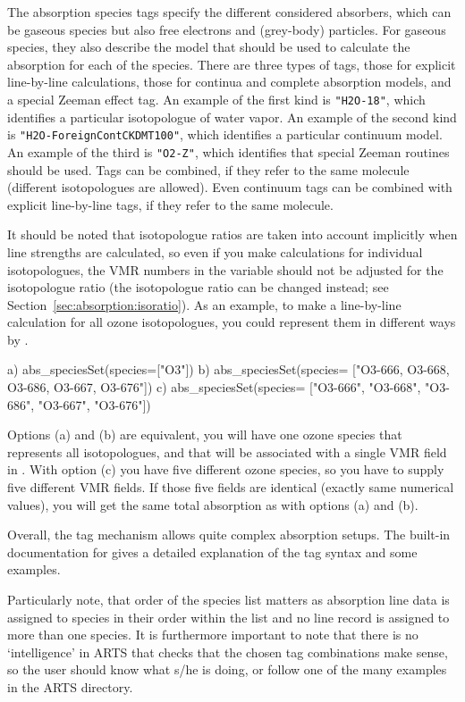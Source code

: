 The absorption species tags specify the different considered absorbers, which can
be gaseous species but also free electrons and (grey-body) particles.
For gaseous species, they also describe the model that should be used to
calculate the absorption for each of the species.
There are three types of tags, those for explicit line-by-line
calculations, those for continua and complete absorption models, and a special
Zeeman effect tag.
An example of the first kind is \verb|"H2O-18"|, which identifies a
particular isotopologue of water vapor. An example of the second kind is
\verb|"H2O-ForeignContCKDMT100"|, which identifies a particular continuum
model. An example of the third is \verb|"O2-Z"|, which identifies that special Zeeman
routines should be used.
Tags can be combined, if they refer to the same molecule
(different isotopologues are allowed). Even continuum tags can be combined
with explicit line-by-line tags, if they refer to the same molecule.

It should be noted that isotopologue ratios are taken into account
implicitly when line strengths are calculated, so even if you make
calculations for individual isotopologues, the VMR numbers in the
variable  should not be adjusted for the isotopologue
ratio (the isotopologue ratio can be changed instead; see
Section~\ref{sec:absorption:isoratio}). As an example, to make a line-by-line
calculation for all ozone isotopologues, you could represent them in different
ways by
.
\begin{code}
a) abs_speciesSet(species=["O3"])
b) abs_speciesSet(species=
                  ["O3-666, O3-668, O3-686, O3-667, O3-676"])
c) abs_speciesSet(species= 
                  ["O3-666", "O3-668", "O3-686", "O3-667", "O3-676"])
\end{code}
Options (a) and (b) are equivalent, you will have one ozone species
that represents all isotopologues, and that will be associated with a
single VMR field in .  With option (c) you have
five different ozone species, so you have to supply five different VMR
fields. If those five fields are identical (exactly same numerical
values), you will get the same total absorption as with options (a)
and (b).

Overall, the tag mechanism allows quite complex absorption setups. The built-in
documentation for  gives a detailed explanation of the
tag syntax and some examples.

Particularly note, that order of the species list matters as absorption line
data is assigned to species in their order within the 
list and no line record is assigned to more than one species.
It is furthermore important to note that there is no `intelligence' in ARTS that
checks that the chosen tag combinations make sense, so the user should
know what s/he is doing, or follow one of the many examples in
the ARTS  directory.

